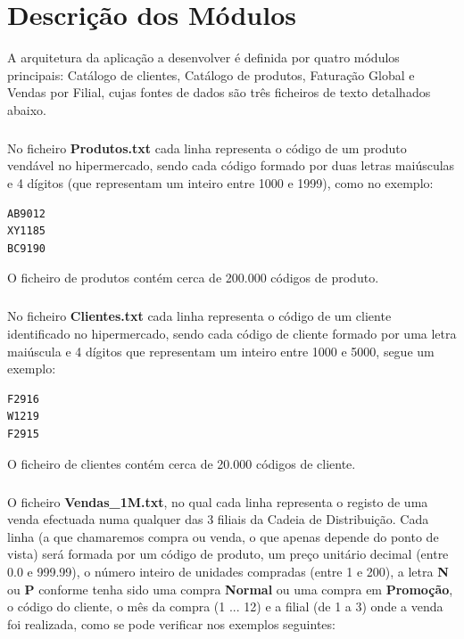 \chapter{Descrição dos Módulos}

A arquitetura da aplicação a desenvolver é definida por quatro módulos principais: Catálogo de clientes, Catálogo de produtos, Faturação Global e Vendas por Filial, cujas fontes de dados são três ficheiros de texto detalhados abaixo.
 
\paragraph{}
No ficheiro \textbf{Produtos.txt} cada linha representa o código de um produto vendável no hipermercado, sendo cada código formado por duas letras maiúsculas e 4 dígitos (que representam um inteiro entre 1000 e 1999), como no exemplo: 

\begin{verbatim}
AB9012
XY1185
BC9190
\end{verbatim}

O ficheiro de produtos contém cerca de 200.000 códigos de produto. 

\paragraph{}
No ficheiro \textbf{Clientes.txt} cada linha representa o código de um cliente identificado no hipermercado, sendo cada código de cliente formado por uma letra maiúscula e 4 dígitos que representam um inteiro entre 1000 e 5000, segue um exemplo: 

\begin{Verbatim}
F2916
W1219
F2915
\end{Verbatim}

O ficheiro de clientes contém cerca de 20.000 códigos de cliente. 

\paragraph{}
O ficheiro \textbf{Vendas\_1M.txt}, no qual cada linha representa o registo de uma venda efectuada numa qualquer das 3 filiais da Cadeia de Distribuição. Cada linha (a que chamaremos compra ou venda, o que apenas depende do ponto de vista) será formada por um código de produto, um preço unitário decimal (entre 0.0 e 999.99), o número inteiro de unidades compradas (entre 1 e 200), a letra \textbf{N} ou \textbf{P} conforme tenha sido uma compra \textbf{Normal} ou uma compra em \textbf{Promoção}, o código do cliente, o mês da compra (1 ... 12) e a filial (de 1 a 3) onde a venda foi realizada, como se pode verificar nos exemplos seguintes:
 
